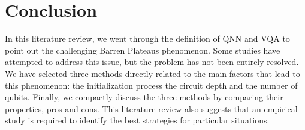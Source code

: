 \section{Conclusion}
In this literature review, we went through the definition of QNN and VQA to point out the challenging Barren Plateaus phenomenon. 
Some studies have attempted to address this issue, but the problem has not been entirely resolved.
We have selected three methods directly related to the main factors that lead to this phenomenon: the initialization process the circuit depth and the number of qubits.
Finally, we compactly discuss the three methods by comparing their properties, pros and cons.
This literature review also suggests that an empirical study is required to identify the best strategies for particular situations.